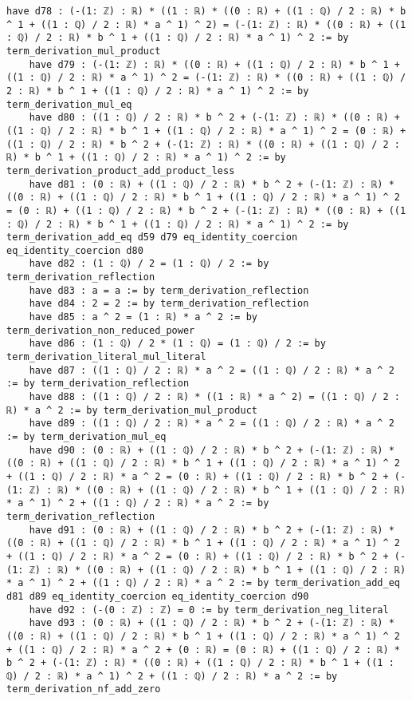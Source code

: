 \documentclass{article}
\begin{document}
\begin{tcolorbox}[colback=white!10, width=\linewidth]
\begin{lstlisting}[language=Lean4]
    have d78 : (-(1: ℤ) : ℝ) * ((1 : ℝ) * ((0 : ℝ) + ((1 : ℚ) / 2 : ℝ) * b ^ 1 + ((1 : ℚ) / 2 : ℝ) * a ^ 1) ^ 2) = (-(1: ℤ) : ℝ) * ((0 : ℝ) + ((1 : ℚ) / 2 : ℝ) * b ^ 1 + ((1 : ℚ) / 2 : ℝ) * a ^ 1) ^ 2 := by term_derivation_mul_product
    have d79 : (-(1: ℤ) : ℝ) * ((0 : ℝ) + ((1 : ℚ) / 2 : ℝ) * b ^ 1 + ((1 : ℚ) / 2 : ℝ) * a ^ 1) ^ 2 = (-(1: ℤ) : ℝ) * ((0 : ℝ) + ((1 : ℚ) / 2 : ℝ) * b ^ 1 + ((1 : ℚ) / 2 : ℝ) * a ^ 1) ^ 2 := by term_derivation_mul_eq
    have d80 : ((1 : ℚ) / 2 : ℝ) * b ^ 2 + (-(1: ℤ) : ℝ) * ((0 : ℝ) + ((1 : ℚ) / 2 : ℝ) * b ^ 1 + ((1 : ℚ) / 2 : ℝ) * a ^ 1) ^ 2 = (0 : ℝ) + ((1 : ℚ) / 2 : ℝ) * b ^ 2 + (-(1: ℤ) : ℝ) * ((0 : ℝ) + ((1 : ℚ) / 2 : ℝ) * b ^ 1 + ((1 : ℚ) / 2 : ℝ) * a ^ 1) ^ 2 := by term_derivation_product_add_product_less
    have d81 : (0 : ℝ) + ((1 : ℚ) / 2 : ℝ) * b ^ 2 + (-(1: ℤ) : ℝ) * ((0 : ℝ) + ((1 : ℚ) / 2 : ℝ) * b ^ 1 + ((1 : ℚ) / 2 : ℝ) * a ^ 1) ^ 2 = (0 : ℝ) + ((1 : ℚ) / 2 : ℝ) * b ^ 2 + (-(1: ℤ) : ℝ) * ((0 : ℝ) + ((1 : ℚ) / 2 : ℝ) * b ^ 1 + ((1 : ℚ) / 2 : ℝ) * a ^ 1) ^ 2 := by term_derivation_add_eq d59 d79 eq_identity_coercion eq_identity_coercion d80
    have d82 : (1 : ℚ) / 2 = (1 : ℚ) / 2 := by term_derivation_reflection
    have d83 : a = a := by term_derivation_reflection
    have d84 : 2 = 2 := by term_derivation_reflection
    have d85 : a ^ 2 = (1 : ℝ) * a ^ 2 := by term_derivation_non_reduced_power
    have d86 : (1 : ℚ) / 2 * (1 : ℚ) = (1 : ℚ) / 2 := by term_derivation_literal_mul_literal
    have d87 : ((1 : ℚ) / 2 : ℝ) * a ^ 2 = ((1 : ℚ) / 2 : ℝ) * a ^ 2 := by term_derivation_reflection
    have d88 : ((1 : ℚ) / 2 : ℝ) * ((1 : ℝ) * a ^ 2) = ((1 : ℚ) / 2 : ℝ) * a ^ 2 := by term_derivation_mul_product
    have d89 : ((1 : ℚ) / 2 : ℝ) * a ^ 2 = ((1 : ℚ) / 2 : ℝ) * a ^ 2 := by term_derivation_mul_eq
    have d90 : (0 : ℝ) + ((1 : ℚ) / 2 : ℝ) * b ^ 2 + (-(1: ℤ) : ℝ) * ((0 : ℝ) + ((1 : ℚ) / 2 : ℝ) * b ^ 1 + ((1 : ℚ) / 2 : ℝ) * a ^ 1) ^ 2 + ((1 : ℚ) / 2 : ℝ) * a ^ 2 = (0 : ℝ) + ((1 : ℚ) / 2 : ℝ) * b ^ 2 + (-(1: ℤ) : ℝ) * ((0 : ℝ) + ((1 : ℚ) / 2 : ℝ) * b ^ 1 + ((1 : ℚ) / 2 : ℝ) * a ^ 1) ^ 2 + ((1 : ℚ) / 2 : ℝ) * a ^ 2 := by term_derivation_reflection
    have d91 : (0 : ℝ) + ((1 : ℚ) / 2 : ℝ) * b ^ 2 + (-(1: ℤ) : ℝ) * ((0 : ℝ) + ((1 : ℚ) / 2 : ℝ) * b ^ 1 + ((1 : ℚ) / 2 : ℝ) * a ^ 1) ^ 2 + ((1 : ℚ) / 2 : ℝ) * a ^ 2 = (0 : ℝ) + ((1 : ℚ) / 2 : ℝ) * b ^ 2 + (-(1: ℤ) : ℝ) * ((0 : ℝ) + ((1 : ℚ) / 2 : ℝ) * b ^ 1 + ((1 : ℚ) / 2 : ℝ) * a ^ 1) ^ 2 + ((1 : ℚ) / 2 : ℝ) * a ^ 2 := by term_derivation_add_eq d81 d89 eq_identity_coercion eq_identity_coercion d90
    have d92 : (-(0 : ℤ) : ℤ) = 0 := by term_derivation_neg_literal
    have d93 : (0 : ℝ) + ((1 : ℚ) / 2 : ℝ) * b ^ 2 + (-(1: ℤ) : ℝ) * ((0 : ℝ) + ((1 : ℚ) / 2 : ℝ) * b ^ 1 + ((1 : ℚ) / 2 : ℝ) * a ^ 1) ^ 2 + ((1 : ℚ) / 2 : ℝ) * a ^ 2 + (0 : ℝ) = (0 : ℝ) + ((1 : ℚ) / 2 : ℝ) * b ^ 2 + (-(1: ℤ) : ℝ) * ((0 : ℝ) + ((1 : ℚ) / 2 : ℝ) * b ^ 1 + ((1 : ℚ) / 2 : ℝ) * a ^ 1) ^ 2 + ((1 : ℚ) / 2 : ℝ) * a ^ 2 := by term_derivation_nf_add_zero

\end{lstlisting}
\end{tcolorbox}
\end{document}
